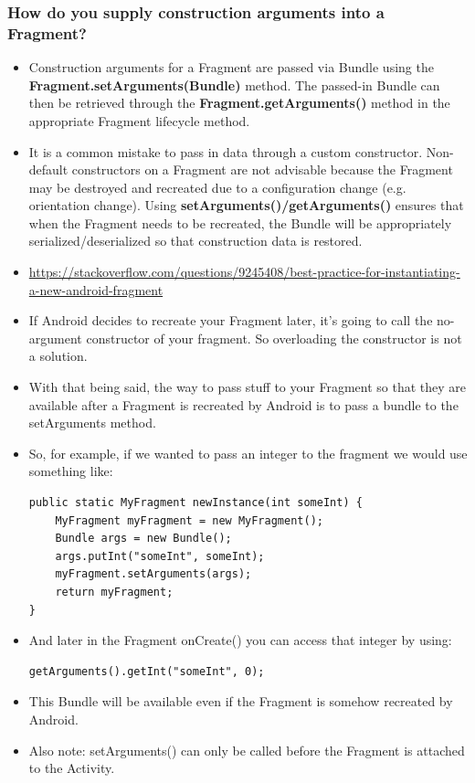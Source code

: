 \documentclass[9pt, b5paper]{article}
\begin{document}
\subsubsection{How do you supply construction arguments into a Fragment?}
\label{sec-1-2-11}
\begin{itemize}
\item Construction arguments for a Fragment are passed via Bundle using the \textbf{Fragment.setArguments(Bundle)} method. The passed-in Bundle can then be retrieved through the \textbf{Fragment.getArguments()} method in the appropriate Fragment lifecycle method.
\item It is a common mistake to pass in data through a custom constructor. Non-default constructors on a Fragment are not advisable because the Fragment may be destroyed and recreated due to a configuration change (e.g. orientation change). Using \textbf{setArguments()/getArguments()} ensures that when the Fragment needs to be recreated, the Bundle will be appropriately serialized/deserialized so that construction data is restored.
\item \url{https://stackoverflow.com/questions/9245408/best-practice-for-instantiating-a-new-android-fragment}
\item If Android decides to recreate your Fragment later, it's going to call the no-argument constructor of your fragment. So overloading the constructor is not a solution.
\item With that being said, the way to pass stuff to your Fragment so that they are available after a Fragment is recreated by Android is to pass a bundle to the setArguments method.
\item So, for example, if we wanted to pass an integer to the fragment we would use something like:
\begin{verbatim}
public static MyFragment newInstance(int someInt) {
    MyFragment myFragment = new MyFragment();
    Bundle args = new Bundle();
    args.putInt("someInt", someInt);
    myFragment.setArguments(args);
    return myFragment;
}
\end{verbatim}
\item And later in the Fragment onCreate() you can access that integer by using:
\begin{verbatim}
getArguments().getInt("someInt", 0);
\end{verbatim}
\item This Bundle will be available even if the Fragment is somehow recreated by Android.
\item Also note: setArguments() can only be called before the Fragment is attached to the Activity.
\end{itemize}
\end{document}
